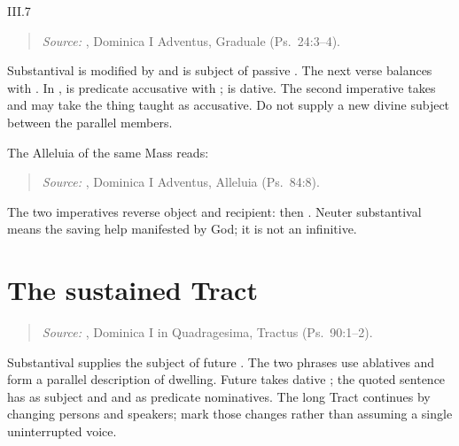 \begin{courseunit}{III.7}
\begin{quote}

\emph{Source:} \Missal, Dominica I Adventus, Graduale (Ps.~24:3--4).
\end{quote}

Substantival  is modified by  and is
subject of passive . The next verse balances
 with . In ,
 is predicate accusative with ;  is dative.
The second imperative  takes  and may take the thing
taught as accusative. Do not supply a new divine subject between the parallel
members.

The Alleluia of the same Mass reads:
\begin{quote}

\emph{Source:} \Missal, Dominica I Adventus, Alleluia (Ps.~84:8).
\end{quote}
The two imperatives reverse object and recipient: 
then . Neuter substantival  means the
saving help manifested by God; it is not an infinitive.

\section{The sustained Tract}

\begin{quote}

\emph{Source:} \Missal, Dominica I in Quadragesima, Tractus (Ps.~90:1--2).
\end{quote}

Substantival  supplies the subject of future .
The two  phrases use ablatives and form a parallel description of
dwelling. Future  takes dative ; the quoted sentence
has  as subject and  and 
as predicate nominatives. The long Tract continues by changing persons and
speakers; mark those changes rather than assuming a single uninterrupted voice.


\end{courseunit}
